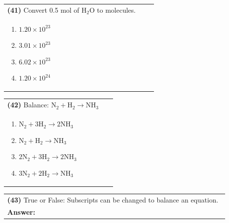 \documentclass{article}
\begin{document}
{\vspace{0.2cm}
\noindent \begin{tabular}{|p{0.9\linewidth}|}
\hline
\vspace{0.2cm}
\textbf{(41)} Convert 0.5 mol of $\mathrm{H_2O}$ to molecules.\\
\begin{minipage}[t]{0.85\linewidth}
\begin{enumerate}[label=\alph*.]
\item $1.20\times10^{23}$
\item $3.01\times10^{23}$
\item $6.02\times10^{23}$
\item $1.20\times10^{24}$
\end{enumerate}
\end{minipage}\\
\hline
\end{tabular}

\vspace{0.2cm}
\noindent \begin{tabular}{|p{0.9\linewidth}|}
\hline
\vspace{0.2cm}
\textbf{(42)} Balance: $\mathrm{N_2 + H_2 \rightarrow NH_3}$\\
\begin{minipage}[t]{0.85\linewidth}
\begin{enumerate}[label=\alph*.]
\item $\mathrm{N_2 + 3H_2 \rightarrow 2NH_3}$
\item $\mathrm{N_2 + H_2 \rightarrow NH_3}$
\item $\mathrm{2N_2 + 3H_2 \rightarrow 2NH_3}$
\item $\mathrm{3N_2 + 2H_2 \rightarrow NH_3}$
\end{enumerate}
\end{minipage}\\
\hline
\end{tabular}

\vspace{0.2cm}
\noindent \begin{tabular}{|p{0.9\linewidth}|}
\hline
\vspace{0.2cm}
\textbf{(43)} True or False: Subscripts can be changed to balance an equation.\\
\textbf{Answer:} \underline{\hspace{2cm}}\\
\hline
\end{tabular}

}
\end{document}
